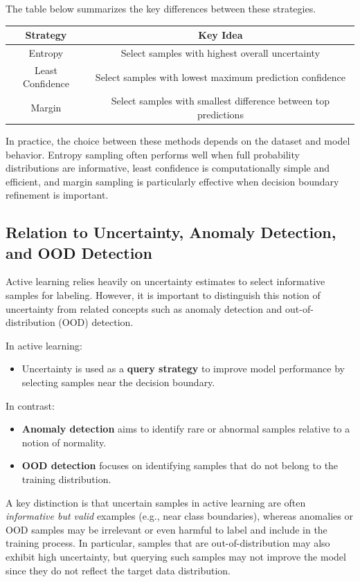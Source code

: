 \documentclass{article}
\begin{document}
The table below summarizes the key differences between these strategies.

\begin{center}
\begin{tabular}{|c|c|}
\hline
\textbf{Strategy} & \textbf{Key Idea} \\
\hline
Entropy & Select samples with highest overall uncertainty \\
Least Confidence & Select samples with lowest maximum prediction confidence \\
Margin & Select samples with smallest difference between top predictions \\
\hline
\end{tabular}
\end{center}

In practice, the choice between these methods depends on the dataset and model behavior. Entropy sampling often performs well when full probability distributions are informative, least confidence is computationally simple and efficient, and margin sampling is particularly effective when decision boundary refinement is important.


\subsection{Relation to Uncertainty, Anomaly Detection, and OOD Detection}

Active learning relies heavily on uncertainty estimates to select informative samples for labeling. However, it is important to distinguish this notion of uncertainty from related concepts such as anomaly detection and out-of-distribution (OOD) detection.

In active learning:
\begin{itemize}
    \item Uncertainty is used as a \textbf{query strategy} to improve model performance by selecting samples near the decision boundary.
\end{itemize}

In contrast:
\begin{itemize}
    \item \textbf{Anomaly detection} aims to identify rare or abnormal samples relative to a notion of normality.
    \item \textbf{OOD detection} focuses on identifying samples that do not belong to the training distribution.
\end{itemize}

A key distinction is that uncertain samples in active learning are often \textit{informative but valid} examples (e.g., near class boundaries), whereas anomalies or OOD samples may be irrelevant or even harmful to label and include in the training process. In particular, samples that are out-of-distribution may also exhibit high uncertainty, but querying such samples may not improve the model since they do not reflect the target data distribution.
\end{document}
